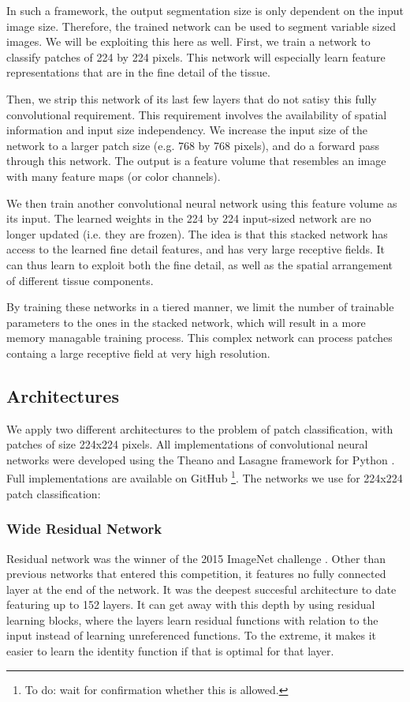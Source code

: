 \documentclass[journal]{IEEEtran}
\begin{document}
In such a framework, the output segmentation size is only dependent on the input image size.  Therefore, the trained network can be used to segment variable sized images. We will be exploiting this here as well. First, we train a network to classify patches of 224 by 224 pixels. This network will especially learn feature representations that are in the fine detail of the tissue. 

Then, we strip this network of its last few layers that do not satisy this fully convolutional requirement. This requirement involves the availability of spatial information and input size independency. We increase the input size of the network to a larger patch size (e.g. 768 by 768 pixels), and do a forward pass through this network. The output is a feature volume  that resembles an image with many feature maps (or color channels). 

We then train another convolutional neural network using this feature volume as its input. The learned weights in the 224 by 224 input-sized network are no longer updated (i.e. they are frozen). The idea is that this stacked network has access to the learned fine detail features, and has very large receptive fields. It can thus learn to exploit both the fine detail, as well as the spatial arrangement of different tissue components.

By training these networks in a tiered manner, we limit the number of trainable parameters to the ones in the stacked network, which will result in a more memory managable training process. This complex network can process patches containg a large receptive field at very high resolution. 

\subsection{Architectures}

We apply two different architectures to the problem of patch classification, with patches of size 224x224 pixels. All implementations of convolutional neural networks were developed using the Theano and Lasagne framework for Python \cite{theano,lasagne}. Full implementations are available on GitHub \footnote{To do: wait for confirmation whether this is allowed.}. The networks we use for 224x224 patch classification:
\medskip

\subsubsection{Wide Residual Network}
Residual network was the winner of the 2015 ImageNet challenge \cite{resnet}. Other than previous networks that entered this competition, it features no fully connected layer at the end of the network. It was the deepest succesful architecture to date featuring up to 152 layers. It can get away with this depth by using residual learning blocks, where the layers learn residual functions with relation to the input instead of learning unreferenced functions. To the extreme, it makes it easier to learn the identity function if that is optimal for that layer.
\end{document}
